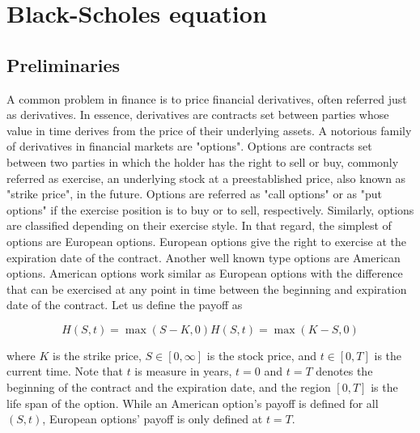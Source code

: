 
\section{Black-Scholes equation} \label{sec:blackscholes}

\subsection{Preliminaries}

A common problem in finance is to price financial derivatives, often referred just
as derivatives. In essence, derivatives are contracts set between parties 
whose value in time derives from the price of their underlying assets. A notorious
family of derivatives in financial markets are "options". Options
are contracts set between two parties in which the holder has the right 
to sell or buy, commonly referred as exercise, an underlying stock at a preestablished price, 
also known as "strike price", in the future. Options are referred as "call options" 
or as "put options" if the exercise position is to buy or to sell, respectively. 
Similarly, options are classified depending on their exercise style. In that regard,
the simplest of options are European options. European options give the right 
to exercise at the expiration date of the contract. Another well known type options 
are American options. American options work similar as European options with the
difference that can be exercised at any point in time between the beginning and 
expiration date of the contract. 
Let us define the payoff as

\begin{subequations} \label{eq:blackscholes:preliminaries:payoff_function}
  \begin{equation}
    H(S,t) = \max(S - K, 0)
  \end{equation}  
  \begin{equation}
    H(S,t) = \max(K - S, 0)
  \end{equation}
\end{subequations}

where $K$ is the strike price, $S\in[0,\infty]$ is the stock price, and 
$t \in [0, T]$ is the current time. Note that $t$ is measure in years, $t=0$ and $t=T$
denotes the beginning of the contract and the expiration date, and
the region $[0,T]$ is the life span of the option. While an American option's payoff
is defined for all $(S,t)$, European options' payoff is only defined at $t=T$.   

